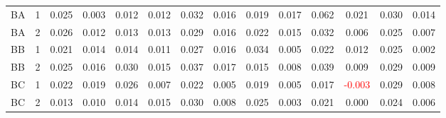 \begin{table}[!htb]
{\begin{tabular}{llcccccccccccc}
BA & 1 & 0.025 & 0.003 & 0.012 & 0.012 & 0.032 & 0.016 & 0.019 & 0.017 & 0.062 & 0.021 & 0.030 & 0.014\\
BA & 2 & 0.026 & 0.012 & 0.013 & 0.013 & 0.029 & 0.016 & 0.022 & 0.015 & 0.032 & 0.006 & 0.025 & 0.007\\
BB & 1 & 0.021 & 0.014 & 0.014 & 0.011 & 0.027 & 0.016 & 0.034 & 0.005 & 0.022 & 0.012 & 0.025 & 0.002\\
BB & 2 & 0.025 & 0.016 & 0.030 & 0.015 & 0.037 & 0.017 & 0.015 & 0.008 & 0.039 & 0.009 & 0.029 & 0.009\\
BC & 1 & 0.022 & 0.019 & 0.026 & 0.007 & 0.022 & 0.005 & 0.019 & 0.005 & 0.017 & \textcolor{red}{-0.003} & 0.029 & 0.008\\
BC & 2 & 0.013 & 0.010 & 0.014 & 0.015 & 0.030 & 0.008 & 0.025 & 0.003 & 0.021 & 0.000 & 0.024 & 0.006\\
\hline
    \end{tabular}%
    }
\end{table}

